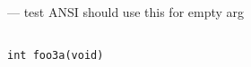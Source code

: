 \startmanpage
{}
--- test ANSI should use this for empty arg 
\startvb\begin{verbatim}

int foo3a(void)

\end{verbatim}
\endvb

\endmanpage
